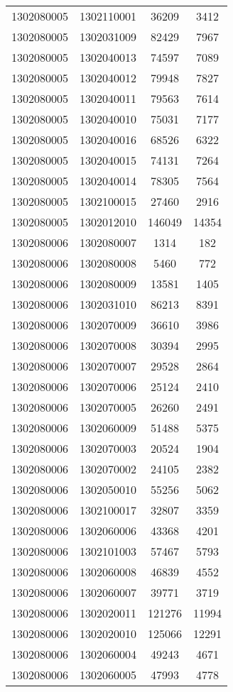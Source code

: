 \begin{longtable}{llcc}
1302080005 & 1302110001 & 36209 & 3412\\
1302080005 & 1302031009 & 82429 & 7967\\
1302080005 & 1302040013 & 74597 & 7089\\
1302080005 & 1302040012 & 79948 & 7827\\
1302080005 & 1302040011 & 79563 & 7614\\
1302080005 & 1302040010 & 75031 & 7177\\
1302080005 & 1302040016 & 68526 & 6322\\
1302080005 & 1302040015 & 74131 & 7264\\
1302080005 & 1302040014 & 78305 & 7564\\
1302080005 & 1302100015 & 27460 & 2916\\
1302080005 & 1302012010 & 146049 & 14354\\
1302080006 & 1302080007 & 1314 & 182\\
1302080006 & 1302080008 & 5460 & 772\\
1302080006 & 1302080009 & 13581 & 1405\\
1302080006 & 1302031010 & 86213 & 8391\\
1302080006 & 1302070009 & 36610 & 3986\\
1302080006 & 1302070008 & 30394 & 2995\\
1302080006 & 1302070007 & 29528 & 2864\\
1302080006 & 1302070006 & 25124 & 2410\\
1302080006 & 1302070005 & 26260 & 2491\\
1302080006 & 1302060009 & 51488 & 5375\\
1302080006 & 1302070003 & 20524 & 1904\\
1302080006 & 1302070002 & 24105 & 2382\\
1302080006 & 1302050010 & 55256 & 5062\\
1302080006 & 1302100017 & 32807 & 3359\\
1302080006 & 1302060006 & 43368 & 4201\\
1302080006 & 1302101003 & 57467 & 5793\\
1302080006 & 1302060008 & 46839 & 4552\\
1302080006 & 1302060007 & 39771 & 3719\\
1302080006 & 1302020011 & 121276 & 11994\\
1302080006 & 1302020010 & 125066 & 12291\\
1302080006 & 1302060004 & 49243 & 4671\\
1302080006 & 1302060005 & 47993 & 4778\\

\end{longtable}

